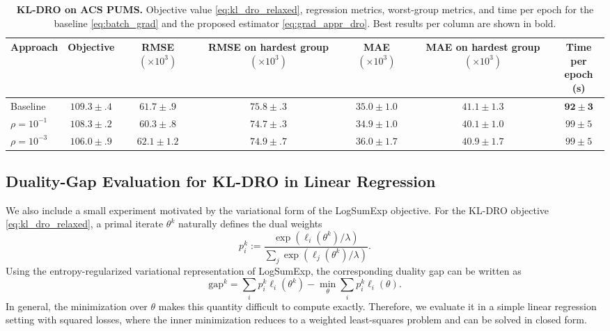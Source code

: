 \documentclass{article}
\theoremstyle{plain}
\theoremstyle{definition}
\theoremstyle{remark}
\begin{document}
\begin{table}
\centering
\small
\setlength{\tabcolsep}{3pt}
\caption{\textbf{KL-DRO on ACS PUMS.} Objective value \eqref{eq:kl_dro_relaxed}, regression metrics, worst-group metrics, and time per epoch for the baseline \eqref{eq:batch_grad} and the proposed estimator \eqref{eq:grad_appr_dro}. Best results per column are shown in bold.}
\label{tab:app_kl_dro_acs}
\begin{tabular}{l|c|c|c|c|c|c}
\toprule
Approach         &  Objective & RMSE $(\times 10^{3})$  & \makecell{RMSE\\ on hardest\\ group $(\times 10^{3})$}  & MAE $(\times 10^{3})$  & \makecell{MAE\\ on hardest\\ group $(\times 10^{3})$} & \makecell{Time per\\ epoch (s)}  \\
    \midrule
Baseline         & $109.3\pm.4$ & $61.7\pm.9$ & $75.8\pm.3$ & $\bm{35.0\pm1.0}$ & $41.1\pm1.3$ & $\bm{92\pm3}$  \\
$\rho=10^{-1}$   & $108.3\pm.2$ & $\bm{60.3\pm.8}$ & $\bm{74.7\pm.3}$ & $\bm{34.9\pm1.0}$ & $\bm{40.1\pm1.0}$ & $99\pm5$  \\
$\rho=10^{-3}$   & $\bm{106.0\pm.9}$ & $62.1\pm1.2$ & $74.9\pm.7$ & $36.0\pm1.7$ & $40.9\pm1.7$ & $99\pm5$  \\
\bottomrule
\end{tabular}
\end{table}


\subsection{Duality-Gap Evaluation for KL-DRO in Linear Regression}\label{app:duality_gap}

We also include a small experiment motivated by the variational form of the LogSumExp objective. For the KL-DRO objective \eqref{eq:kl_dro_relaxed}, a primal iterate $\theta^k$ naturally defines the dual weights
\[
    p_i^k
    :=
    \frac{\exp(\ell_i(\theta^k)/\lambda)}
    {\sum_j \exp(\ell_j(\theta^k)/\lambda)}.
\]
Using the entropy-regularized variational representation of LogSumExp, the corresponding duality gap can be written as
\[
    \mathrm{gap}^k
    =
    \sum_i p_i^k \ell_i(\theta^k)
    -
    \min_{\theta}
    \sum_i p_i^k \ell_i(\theta).
\]
In general, the minimization over $\theta$ makes this quantity difficult to compute exactly. Therefore, we evaluate it in a simple linear regression setting with squared losses, where the inner minimization reduces to a weighted least-squares problem and can be solved in closed form.
\end{document}
